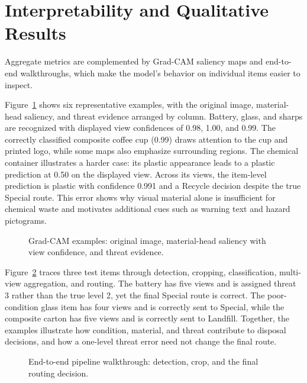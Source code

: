 \section{Interpretability and Qualitative Results}
\label{sec:qualitative}
Aggregate metrics are complemented by Grad-CAM saliency maps and end-to-end walkthroughs, which make the model's behavior on individual items easier to inspect.

Figure~\ref{fig:gradcam} shows six representative examples, with the original image, material-head saliency, and threat evidence arranged by column. Battery, glass, and sharps are recognized with displayed view confidences of 0.98, 1.00, and 0.99. The correctly classified composite coffee cup (0.99) draws attention to the cup and printed logo, while some maps also emphasize surrounding regions. The chemical container illustrates a harder case: its plastic appearance leads to a plastic prediction at 0.50 on the displayed view. Across its views, the item-level prediction is plastic with confidence 0.991 and a Recycle decision despite the true Special route. This error shows why visual material alone is insufficient for chemical waste and motivates additional cues such as warning text and hazard pictograms.

\begin{figure}[!ht]
    \centering
    \caption{Grad-CAM examples: original image, material-head saliency with view confidence, and threat evidence.}
    \label{fig:gradcam}
\end{figure}

Figure~\ref{fig:qualdemo} traces three test items through detection, cropping, classification, multi-view aggregation, and routing. The battery has five views and is assigned threat 3 rather than the true level 2, yet the final Special route is correct. The poor-condition glass item has four views and is correctly sent to Special, while the composite carton has five views and is correctly sent to Landfill. Together, the examples illustrate how condition, material, and threat contribute to disposal decisions, and how a one-level threat error need not change the final route.

\begin{figure}[!ht]
    \centering
    \caption{End-to-end pipeline walkthrough: detection, crop, and the final routing decision.}
    \label{fig:qualdemo}
\end{figure}

